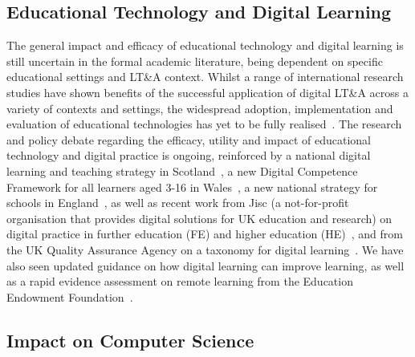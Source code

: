 \documentclass[sigconf]{acmart}
\begin{document}
\subsection{Educational Technology and Digital Learning}

The general impact and efficacy of educational technology and digital
learning is still uncertain in the formal academic literature, being
dependent on specific educational settings and LT\&A context. Whilst a
range of international research studies have shown benefits of the
successful application of digital LT\&A across a variety of contexts
and settings, the widespread adoption, implementation and evaluation
of educational technologies has yet to be fully
realised~\cite{decodinglearning:2012,means:2014,ecjrc:2017,mayer:2018}.
The research and policy debate regarding the efficacy, utility and
impact of educational technology and digital practice is ongoing,
reinforced by a national digital learning and teaching strategy in
Scotland~\cite{digscot:2016}, a new Digital Competence Framework for
all learners aged 3-16 in
Wales~\cite{wgictreview:2013,wgdcfguidance:2018}, a new national
strategy for schools in England~\cite{dfe:2019}, as well as recent
work from Jisc (a not-for-profit organisation that provides digital
solutions for UK education and research) on digital practice in
further education (FE) and higher education
(HE)~\cite{lanclos+phipps:2019}, and from the UK Quality Assurance
Agency on a taxonomy for digital
learning~\cite{qaadigtaxonomy:2020}. We have also seen updated
guidance on how digital learning can improve learning, as well as a
rapid evidence assessment on remote learning from the Education
Endowment Foundation~\cite{eefdigtech:2019,eefremote:2020}.

\subsection{Impact on Computer Science}
\end{document}
